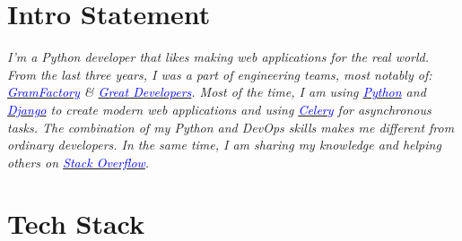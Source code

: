 \documentclass[10.1pt,a4paper,sans]{moderncv}        %
\begin{document}
\makecvtitle
\vspace{-30pt}
\section{Intro Statement}

\vspace{3pt}

\textit{\small{I’m a Python developer that likes making web applications for the real world. \newline
From the last three years, I was a part of engineering teams, most notably of: \href{https://gramfactory.com}{\textcolor{blue}{GramFactory}} \& \href{https://github.com/GreatDevelopers}{\textcolor{blue}{Great Developers}}. Most of the time, I am using \href{https://www.python.org/}{\textcolor{blue}{Python}} and \href{https://www.djangoproject.com/}{\textcolor{blue}{Django}} to create modern web applications and using \href{http://www.celeryproject.org/}{\textcolor{blue}{Celery}} for asynchronous tasks. The combination of my Python and DevOps skills makes me different from ordinary developers. In the same time, I am sharing my knowledge and helping others on \href{https://stackoverflow.com/users/4124229/jagjeet-singh}{\textcolor{blue}{Stack Overflow}}.}}

\section{Tech Stack}

\vspace{3pt}
\end{document}

